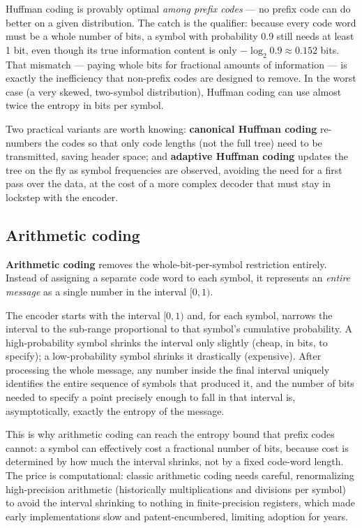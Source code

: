 \documentclass[11pt]{article}
\begin{document}
Huffman coding is provably optimal \emph{among prefix codes} — no prefix code can do better on a given distribution. The catch is the qualifier: because every code word must be a whole number of bits, a symbol with probability 0.9 still needs at least 1 bit, even though its true information content is only $-\log_2 0.9 \approx 0.152$ bits. That mismatch — paying whole bits for fractional amounts of information — is exactly the inefficiency that non-prefix codes are designed to remove. In the worst case (a very skewed, two-symbol distribution), Huffman coding can use almost twice the entropy in bits per symbol.

Two practical variants are worth knowing: \textbf{canonical Huffman coding} re-numbers the codes so that only code lengths (not the full tree) need to be transmitted, saving header space; and \textbf{adaptive Huffman coding} updates the tree on the fly as symbol frequencies are observed, avoiding the need for a first pass over the data, at the cost of a more complex decoder that must stay in lockstep with the encoder.

\subsection{Arithmetic coding}

\textbf{Arithmetic coding} removes the whole-bit-per-symbol restriction entirely. Instead of assigning a separate code word to each symbol, it represents an \emph{entire message} as a single number in the interval $[0,1)$.

The encoder starts with the interval $[0,1)$ and, for each symbol, narrows the interval to the sub-range proportional to that symbol's cumulative probability. A high-probability symbol shrinks the interval only slightly (cheap, in bits, to specify); a low-probability symbol shrinks it drastically (expensive). After processing the whole message, any number inside the final interval uniquely identifies the entire sequence of symbols that produced it, and the number of bits needed to specify a point precisely enough to fall in that interval is, asymptotically, exactly the entropy of the message.

This is why arithmetic coding can reach the entropy bound that prefix codes cannot: a symbol can effectively cost a fractional number of bits, because cost is determined by how much the interval shrinks, not by a fixed code-word length. The price is computational: classic arithmetic coding needs careful, renormalizing high-precision arithmetic (historically multiplications and divisions per symbol) to avoid the interval shrinking to nothing in finite-precision registers, which made early implementations slow and patent-encumbered, limiting adoption for years.
\end{document}
